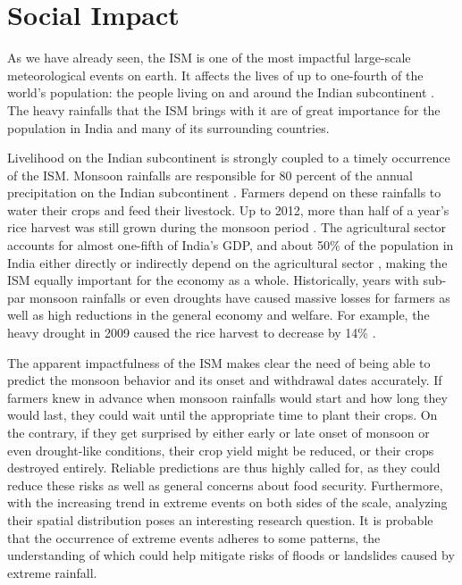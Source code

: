 \section{Social Impact}
\label{st:ism_impact}
As we have already seen, the ISM is one of the most impactful large-scale meteorological events on earth. It affects the lives of up to one-fourth of the world's population: the people living on and around the Indian subcontinent \citep{Stolbova.2015}. The heavy rainfalls that the ISM brings with it are of great importance for the population in India and many of its surrounding countries.

Livelihood on the Indian subcontinent is strongly coupled to a timely occurrence of the ISM. Monsoon rainfalls are responsible for 80 percent of the annual precipitation on the Indian subcontinent \citep{Jin.2017}. Farmers depend on these rainfalls to water their crops and feed their livestock. Up to 2012, more than half of a year's rice harvest was still grown during the monsoon period \citep{Auffhammer.2012}. The agricultural sector accounts for almost one-fifth of India's GDP, and about 50\% of the population in India either directly or indirectly depend on the agricultural sector \citep{CentralIntelligenceAgency.05.01.2018}, making the ISM equally important for the economy as a whole. Historically, years with sub-par monsoon rainfalls or even droughts have caused massive losses for farmers as well as high reductions in the general economy and welfare. For example, the heavy drought in 2009 caused the rice harvest to decrease by 14\% \citep{Auffhammer.2012}.

The apparent impactfulness of the ISM makes clear the need of being able to predict the monsoon behavior and its onset and withdrawal dates accurately. If farmers knew in advance when monsoon rainfalls would start and how long they would last, they could wait until the appropriate time to plant their crops. On the contrary, if they get surprised by either early or late onset of monsoon or even drought-like conditions, their crop yield might be reduced, or their crops destroyed entirely. Reliable predictions are thus highly called for, as they could reduce these risks as well as general concerns about food security. Furthermore, with the increasing trend in extreme events on both sides of the scale, analyzing their spatial distribution poses an interesting research question. It is probable that the occurrence of extreme events adheres to some patterns, the understanding of which could help mitigate risks of floods or landslides caused by extreme rainfall.







